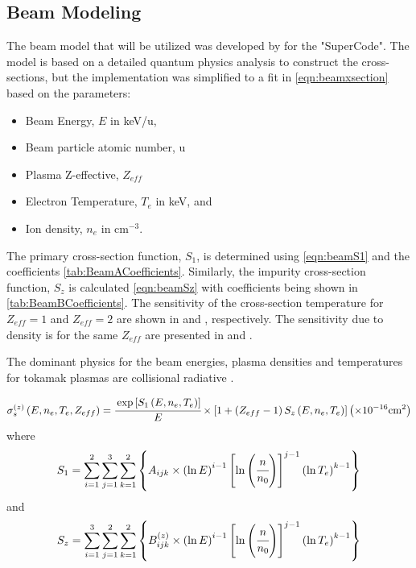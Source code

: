 \subsection{Beam Modeling} \label{sub:BeamModeling}
The beam model that will be utilized was developed by \citeauthor{Mandrekas1992} \cite{Mandrekas1992} for the "SuperCode". The model is based on a detailed quantum physics analysis to construct the cross-sections, but the implementation was simplified to a fit in \cref{eqn:beamxsection} based on the parameters:
\begin{itemize}
	\item Beam Energy, $E$ in keV/u,
	\item Beam particle atomic number, u
	\item Plasma Z-effective, $Z_{eff}$
	\item Electron Temperature, $T_e$ in keV, and
	\item Ion density, $n_e$ in $\text{cm}^{-3}$.
\end{itemize}
The primary cross-section function, $S_1$, is determined using \cref{eqn:beamS1} and the coefficients \cref{tab:BeamACoefficients}. Similarly, the impurity cross-section function, $S_z$ is calculated \cref{eqn:beamSz} with coefficients being shown in \cref{tab:BeamBCoefficients}. The sensitivity of the cross-section temperature for $Z_{eff}=1$ and $Z_{eff}=2$ are shown in  and , respectively. The sensitivity due to density is for the same $Z_{eff}$ are presented in  and .

The dominant physics for the beam energies, plasma densities and temperatures for tokamak plasmas are collisional radiative \cite{Janev1989}. 


\begin{equation}
	\sigma_s^{\left(z\right)}\left(E, n_e, T_e, Z_{eff}\right) = \cfrac{\exp\left[S_1\left(E, n_e, T_e\right)\right]}{E}
	\times \left[1 + \left(Z_{eff}-1\right) S_z\left(E, n_e, T_e\right) \right] \left(\times 10^{-16} \text{cm}^2 \right)
	\label{eqn:beamxsection}
\end{equation}
%
where
%
\begin{equation}
	S_1 = \sum_{i=1}^{2} \sum_{j=1}^{3} \sum_{k=1}^{2} \left\{ A_{ijk} \times \left(\ln E\right)^{i-1} 
	\left[ \ln \left(\cfrac{n}{n_0}\right) \right]^{j-1} \left( \ln T_e\right)^{k-1} \right\}
	\label{eqn:beamS1}
\end{equation}
%
and
%
\begin{equation}
	S_z = \sum_{i=1}^{3} \sum_{j=1}^{2} \sum_{k=1}^{2} \left\{ B_{ijk}^{\left(z\right)} \times \left(\ln E\right)^{i-1} 
	\left[ \ln \left(\cfrac{n}{n_0}\right) \right]^{j-1} \left( \ln T_e\right)^{k-1} \right\}
	\label{eqn:beamSz}
\end{equation}

